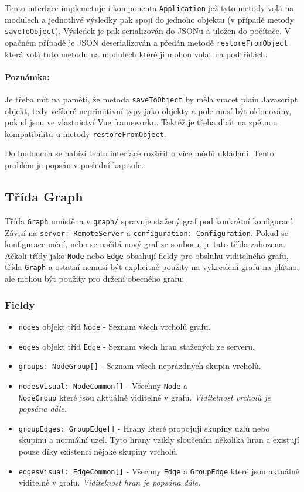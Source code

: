 Tento interface implemetuje i komponenta \texttt{Application} jež tyto metody volá na modulech a jednotlivé výsledky pak spojí do jednoho objektu (v případě metody \texttt{saveToObject}). Výsledek je pak serializován do JSONu a uložen do počítače. V opačném případě je JSON deserializován a předán metodě \texttt{restoreFromObject} která volá tuto metodu na modulech které ji mohou volat na podtřídách.

\paragraph{Poznámka:} Je třeba mít na paměti, že metoda \texttt{saveToObject} by měla vracet plain Javascript objekt, tedy veškeré neprimitivní typy jako objekty a pole musí být oklonovány, pokud jsou ve vlastnictví Vue frameworku. Taktéž je třeba dbát na zpětnou kompatibilitu u metody \texttt{restoreFromObject}.

\smallskip

Do budoucna se nabízí tento interface rozšířit o více módů ukládání. Tento problém je popsán v poslední kapitole.

\subsection{Třída Graph}
Třída \texttt{Graph} umístěna v \texttt{graph/} spravuje stažený graf pod konkrétní konfigurací. Závisí na \texttt{server: RemoteServer} a \texttt{configuration: Configuration}. Pokud se konfigurace mění, nebo se načítá nový graf ze souboru, je tato třída zahozena. Ačkoli třídy jako \texttt{Node} nebo \texttt{Edge} obsahují fieldy pro obsluhu viditelného grafu, třída \texttt{Graph} a ostatní nemusí být explicitně použity na vykreslení grafu na plátno, ale mohou být použity pro držení obecného grafu.

\subsubsection*{Fieldy}
\begin{itemize}
  \item \texttt{nodes} objekt tříd \texttt{Node} - Seznam všech vrcholů grafu.
  \item \texttt{edges} objekt tříd \texttt{Edge} - Seznam všech hran stažených ze serveru.
  \item \texttt{groups: NodeGroup[]} - Seznam všech neprázdných skupin vrcholů.
  \item \texttt{nodesVisual: NodeCommon[]} - Všechny \texttt{Node} a \\\texttt{NodeGroup} které jsou aktuálně viditelné v grafu. \textit{Viditelnost vrcholů je popsána dále.}
  \item \texttt{groupEdges: GroupEdge[]} - Hrany které propojují skupiny uzlů nebo skupinu a normální uzel. Tyto hrany vzikly sloučením několika hran a existují pouze díky existenci nějaké skupiny vrcholů.
  \item \texttt{edgesVisual: EdgeCommon[]} - Všechny \texttt{Edge} a \texttt{GroupEdge} které jsou aktuálně viditelné v grafu. \textit{Viditelnost hran je popsána dále.}
\end{itemize}

